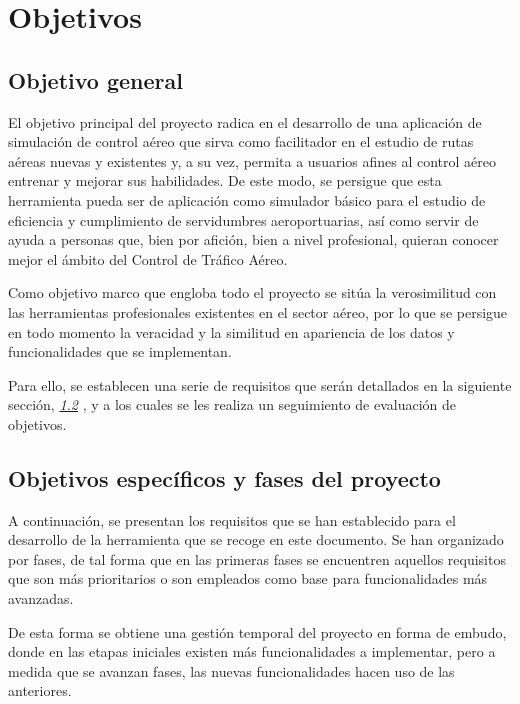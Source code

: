 \chapter{Objetivos} %
\label{chap:objetivos}

\section{Objetivo general} %
\label{sec:objetivo-general} %

El objetivo principal del proyecto radica en el desarrollo de una aplicación de simulación de control aéreo que sirva como facilitador en el estudio de rutas aéreas nuevas y existentes y, a su vez, permita a usuarios afines al control aéreo entrenar y mejorar sus habilidades. De este modo, se persigue que esta herramienta pueda ser de aplicación como simulador básico para el estudio de eficiencia y cumplimiento de servidumbres aeroportuarias, así como servir de ayuda a personas que, bien por afición, bien a nivel profesional, quieran conocer mejor el ámbito del Control de Tráfico Aéreo.

Como objetivo marco que engloba todo el proyecto se sitúa la verosimilitud con las herramientas profesionales existentes en el sector aéreo, por lo que se persigue en todo momento la veracidad y la similitud en apariencia de los datos y funcionalidades que se implementan.

Para ello, se establecen una serie de requisitos que serán detallados en la siguiente sección, \textit{\ref{sec:objetivos-especificos-fases} }, y a los cuales se les realiza un seguimiento de evaluación de objetivos.


\section{Objetivos específicos y fases del proyecto}
\label{sec:objetivos-especificos-fases}


A continuación, se presentan los requisitos que se han establecido para el desarrollo de la herramienta que se recoge en este documento. Se han organizado por fases, de tal forma que en las primeras fases se encuentren aquellos requisitos que son más prioritarios o son empleados como base para funcionalidades más avanzadas.

De esta forma se obtiene una gestión temporal del proyecto en forma de embudo, donde en las etapas iniciales existen más funcionalidades a implementar, pero a medida que se avanzan fases, las nuevas funcionalidades hacen uso de las anteriores.


